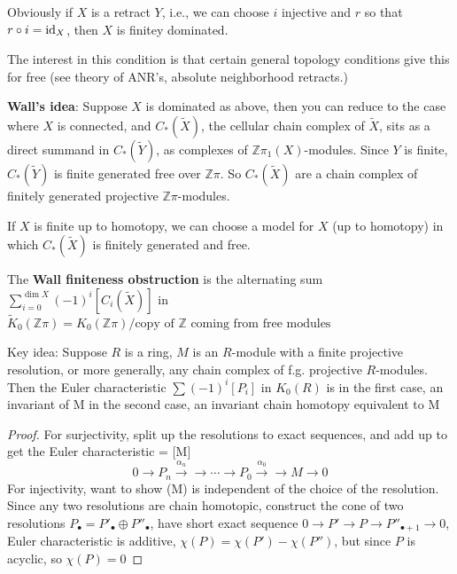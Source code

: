 \documentclass[main]{subfiles}
\begin{document}
Obviously if $X$ is a retract $Y$, i.e., we can choose $i$ injective and $r$ so that $r\circ i=\operatorname{id}_X$, then $X$ is finitey dominated.

The interest in this condition is that certain general topology conditions give this for free (see theory of ANR's, absolute neighborhood retracts.)

\textbf{Wall's idea}: Suppose $X$ is dominated as above, then you can reduce to the case where $X$ is connected, and $C_*(\tilde X)$, the cellular chain complex of $\tilde X$, sits as a direct summand in $C_*(\tilde Y)$, as complexes of $\mathbb Z\pi_1(X)$-modules. Since $Y$ is finite, $C_*(\tilde Y)$ is finite generated free over $\mathbb Z\pi$. So $C_*(\tilde X)$ are a chain complex of finitely generated projective $\mathbb Z\pi$-modules.

If $X$ is finite up to homotopy, we can choose a model for $X$ (up to homotopy) in which $C_*(\tilde X)$ is finitely generated and free.

The \textbf{Wall finiteness obstruction} is the alternating sum $\sum_{i=0}^{\dim X}(-1)^i[C_i(\tilde X)]$ in $\tilde K_0(\mathbb Z\pi)=K_0(\mathbb Z\pi)/\text{copy of $\mathbb Z$ coming from free modules}$

Key idea: Suppose $R$ is a ring, $M$ is an $R$-module with a finite projective resolution, or more generally, any chain complex of f.g. projective $R$-modules. Then the Euler characteristic $\sum(-1)^i[P_i]$ in $K_0(R)$ is 
in the first case, an invariant of M
in the second case, an invariant chain homotopy equivalent to M

\begin{proof}
For surjectivity, split up the resolutions to exact sequences, and add up to get the Euler characteristic = [M]
\[0\to P_n\xrightarrow{\alpha_n}\to\cdots\to P_0\xrightarrow{\alpha_0}\to M\to 0\]
For injectivity, want to show \chi(M) is independent of the choice of the resolution. Since any two resolutions are chain homotopic, construct the cone of two resolutions $P_\bullet=P'_\bullet\oplus P''_\bullet$, have short exact sequence $0\to P'\to P\to P''_{\bullet+1}\to0$, Euler characteristic is additive, $\chi(P)=\chi(P')-\chi(P'')$, but since $P$ is acyclic, so $\chi(P)=0$
\end{proof}
\end{document}
